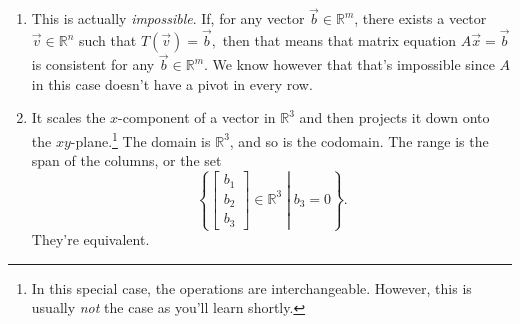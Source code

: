\begin{enumerate}
\[		  = -1/2 \cdot T\left(\begin{bmatrix}1 \\ 3\end{bmatrix}\right) + 3/2 \cdot T\left(\begin{bmatrix}1 \\ 1 \end{bmatrix}\right).\]
		Similarly, we get that 
		\[T\left(\begin{bmatrix}0 \\ 1\end{bmatrix}\right) 
		  = T\left(1/2\begin{bmatrix}1 \\ 3\end{bmatrix} - 1/2\begin{bmatrix}1 \\ 1 \end{bmatrix}\right)
		  = 1/2 \cdot T\left(\begin{bmatrix}1 \\ 3\end{bmatrix}\right) - 1/2 \cdot T\left(\begin{bmatrix}1 \\ 1 \end{bmatrix}\right).\]
		The standard matrix is therefore 
		\[\begin{bmatrix}T\left(\begin{bmatrix}1 \\ 0\end{bmatrix}\right) & T\left(\begin{bmatrix}0 \\ 1\end{bmatrix}\right) \end{bmatrix}
		  = \begin{bmatrix}1 & 0\\ -5/2 & 5/2\\ 1/2 & 1/2\end{bmatrix}\] The domain is \(\mathbb{R}^2\), and the range is the span of the columns of the
		standard matrix.
	\item This is actually \emph{impossible}. If, for any vector \(\vec{b} \in \mathbb{R}^m\), there exists a vector \(\vec{v} \in \mathbb{R}^n\) such that 
		\(T(\vec{v}) = \vec{b},\) then that means that matrix equation \(A\vec{x} = \vec{b}\) is consistent for any \(\vec{b} \in \mathbb{R}^m\). We know
		however that that's impossible since \(A\) in this case doesn't have a pivot in every row.

	\item It scales the \(x\)-component of a vector in \(\mathbb{R}^3\) and then projects it down onto the \(xy\)-plane.\footnote{In this special case, the operations are interchangeable. However, this is usually \emph{not} the case as you'll learn shortly.} The domain is \(\mathbb{R}^3\), and so is the codomain.
		The range is the span of the columns, or the set \[\left\{\!\left.\begin{bmatrix}b_1 \\ b_2 \\ b_3\end{bmatrix} \in \mathbb{R}^3 \;\right|\; b_3 = 0\!\right\}.\] They're equivalent.


\end{enumerate}
